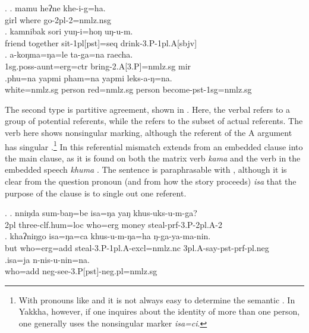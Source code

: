\ex.  \ag. mamu heʔne khe-i-g=ha.\label{verb-infl-example}\\
		girl where go{\sc [pst]-2pl-2=nmlz.nsg}\\
	\bg.  kamnibak sori yuŋ-i=hoŋ uŋ-u-m.\\
		friend together sit{\sc -1pl[pst]=seq} drink{\sc -3.P-1pl.A[sbjv]}\\
	\bg. a-koŋma=ŋa=le   ta-ga=na           raecha.\\
		{\sc 1sg.poss-}aunt{\sc =erg=ctr} bring{\sc [pst]-2.A[3.P]=nmlz.sg} {\sc mir} \\
		 
		\bg.phu=na yapmi pham=na yapmi leks-a-ŋ=na.\\
		white{\sc =nmlz.sg} person red{\sc =nmlz.sg} person become{\sc -pst-1sg=nmlz.sg}\\
 
 
 The second type is partitive agreement, shown in \Next. Here, the verbal  refers to a group of potential referents, while the  refers to the subset of actual referents. The verb here shows nonsingular  marking, although the referent of the A argument has singular .\footnote{With pronouns like  and  it is not always easy to determine the semantic . In Yakkha, however, if one inquires about the identity of more than one person, one generally uses the nonsingular marker \emph{isa=ci}.}  In \Next[b] this referential mismatch extends from an embedded clause into the main clause, as it is found on both the matrix verb \emph{kama}  and the verb in the embedded speech \emph{khuma} . The sentence is paraphrasable with , although it is clear from the question pronoun (and from how the story proceeds) \emph{isa}  that the purpose of the clause is to single out one referent.
  
 \ex. \ag. nniŋda  sum-baŋ=be          isa=ŋa   yaŋ  khus-uks-u-m-ga?\\
 	{\sc 2pl} three{\sc -clf.hum=loc} who{\sc =erg} money steal{\sc [pst]-prf-3.P-2pl.A-2}\\
 	\bg. khaʔniŋgo isa=ŋa=ca      khus-u-m-ŋa=ha ŋ-ga-ya-ma-nin.\\
 	but who{\sc =erg=add} steal{\sc [pst]-3.P-1pl.A-excl=nmlz.nc} {\sc 3pl.A-}say{\sc -pst-prf-pl.neg}\\
 	 
\bg.isa=ja n-nis-u-nin=na.\\
who{\sc =add} {\sc neg-}see{\sc -3.P[pst]-neg.pl=nmlz.sg}\\
 







